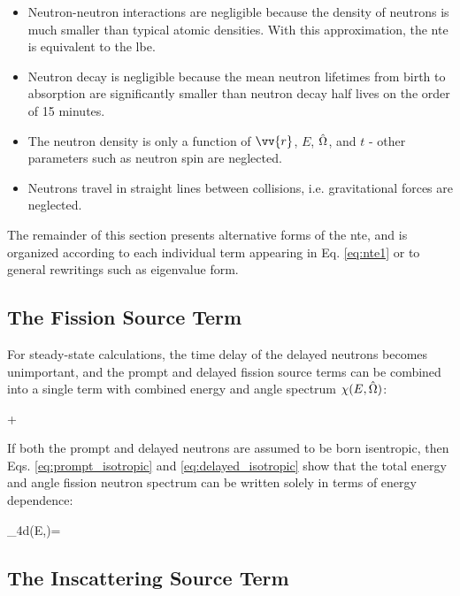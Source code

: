 \begin{itemize}
\item Neutron-neutron interactions are negligible because the density of neutrons is much smaller than typical atomic densities. With this approximation, the \gls{nte} is equivalent to the \gls{lbe}.
\item Neutron decay is negligible because the mean neutron lifetimes from birth to absorption are significantly smaller than neutron decay half lives on the order of 15 minutes.
\item The neutron density is only a function of \(\vv{r}\), \(E\), \(\hat{\Omega}\), and \(t\) - other parameters such as neutron spin are neglected.
\item Neutrons travel in straight lines between collisions, i.e. gravitational forces are neglected.
\end{itemize}

The remainder of this section presents alternative forms of the \gls{nte}, and is organized according to each individual term appearing in Eq. \eqref{eq:nte1} or to general rewritings such as eigenvalue form.

\subsection{The Fission Source Term}

For steady-state calculations, the time delay of the delayed neutrons becomes unimportant, and the prompt and delayed fission source terms can be combined into a single term with combined energy and angle spectrum \(\chi(E,\hat{\Omega})\):

\beqa
\label{eq:LumpedFission}
\promptfissionsource\psi\seatprime+\delayedfissionsource\rightarrow\hspace{0.5cm}\\
\totalfissionsource\psi\seatprime
\eeqa

If both the prompt and delayed neutrons are assumed to be born isentropic, then Eqs. \eqref{eq:prompt_isotropic} and \eqref{eq:delayed_isotropic} show that the total energy and angle fission neutron spectrum can be written solely in terms of energy dependence:

\beq
\int_{4\pi}d\hO\chi(E,\hO)=
\eeq

\subsection{The Inscattering Source Term}

